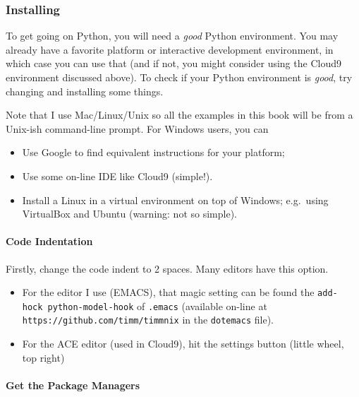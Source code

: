 \subsubsection{Installing}\label{installing}

To get going on Python, you will need a \emph{good} Python environment.
You may already have a favorite platform or interactive development
environment, in which case you can use that (and if not, you might
consider using the Cloud9 environment discussed above). To check if your
Python environment is \emph{good}, try changing and installing some
things.

Note that I use Mac/Linux/Unix so all the examples in this book will be
from a Unix-ish command-line prompt. For Windows users, you can

\begin{itemize}
\itemsep1pt\parskip0pt
\item
  Use Google to find equivalent instructions for your platform;
\item
  Use some on-line IDE like Cloud9 (simple!).
\item
  Install a Linux in a virtual environment on top of Windows; e.g.~using
  VirtualBox and Ubuntu (warning: not so simple).
\end{itemize}

\paragraph{Code Indentation}\label{code-indentation}

Firstly, change the code indent to 2 spaces. Many editors have this
option.

\begin{itemize}
\itemsep1pt\parskip0pt
\item
  For the editor I use (EMACS), that magic setting can be found the
  \texttt{add-hock\ \textquotesingle{}python-model-hook} of
  \texttt{.emacs} (available on-line at
  \texttt{https://github.com/timm/timmnix} in the \texttt{dotemacs}
  file).
\item
  For the ACE editor (used in Cloud9), hit the settings button (little
  wheel, top right)
\end{itemize}

\paragraph{Get the Package Managers}\label{get-the-package-managers}

